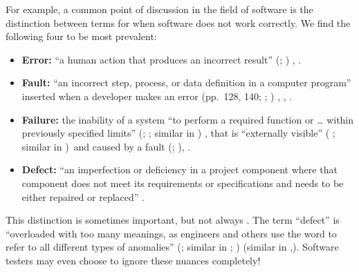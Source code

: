 \label{error-fault-failure}
For example, a common point of discussion in the field of software is the
distinction between terms for when software does not work correctly. We find
the following four to be most prevalent:
\begin{itemize}
    \item \textbf{Error:} ``a human action that produces an incorrect result''
          \ifnotpaper (\citealp[p.~128]{IEEE2010};
              \citealp[p.~399]{vanVliet2000})\else
              \cite[p.~128]{IEEE2010}, \cite[p.~399]{vanVliet2000}\fi.
    \item \textbf{Fault:} ``an incorrect step, process, or data definition in a
          computer program'' \citep[p.~140]{IEEE2010} inserted when a developer
          makes an error \ifnotpaper (pp.~128, 140; \citealp[p.~12\=/3]{SWEBOK2025};
              \citealp[pp.~399\==400]{vanVliet2000})\else
              \cite[pp.~128, 140]{IEEE2010}, \cite[pp.~399\==400]{vanVliet2000},
              \cite[p.~12\=/3]{SWEBOK2025}\fi.
    \item \textbf{Failure:} the inability of a system ``to perform a required
          function or \dots{} within previously specified limits'' \ifnotpaper
              (\citealp[p.~7]{IEEE2019a}; \citealp{ISO_IEC2005}; similar in \citealp[p.~400]{vanVliet2000})
          \else \cite[p.~7]{IEEE2019a}, \cite{ISO_IEC2005} \fi that is
          ``externally visible'' \ifnotpaper(\fi\citealp[p.~7]{IEEE2019a}%
          \ifnotpaper; similar in \citealp[p.~400]{vanVliet2000})\fi\
          and caused by a fault \ifnotpaper (\citealp[p.~12\=/3]{SWEBOK2025};
              \citealp[p.~400]{vanVliet2000})\else \cite[p.~400]{vanVliet2000},
              \cite[p.~12\=/3]{SWEBOK2025}\fi.
    \item \textbf{Defect:} ``an imperfection or deficiency in a project
          component where that component does not meet its requirements or
          specifications and needs to be either repaired or replaced''
          \citep[p.~96]{IEEE2010}.
\end{itemize}
This distinction is sometimes important, but not always
\citep[p.~4\=/3]{SWEBOK2014}. The term ``defect'' is
``overloaded with too many meanings, as engineers and others use the word to
refer to all different types of anomalies'' \ifnotpaper
    (\citealp[p.~12\=/3]{SWEBOK2025}; similar in \citealp[p.~124]{IEEE2017};
    \citeyear[p.~96]{IEEE2010}\todo{OG 2005})\else \cite[p.~12\=/3]{SWEBOK2025}
    (similar in \cite[p.~96]{IEEE2010},\cite[p.~124]{IEEE2017})\fi. Software testers
may even choose to ignore these nuances completely! \refHelper \bugPattonFlaw{}

